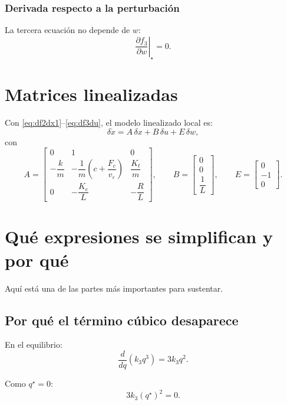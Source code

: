 \documentclass[11pt]{article}
\begin{document}
\subsubsection{Derivada respecto a la perturbaci\'on}

La tercera ecuaci\'on no depende de $w$:
\[
\left.\frac{\partial f_3}{\partial w}\right|_\star = 0.
\]

\section{Matrices linealizadas}

Con \eqref{eq:df2dx1}--\eqref{eq:df3du}, el modelo linealizado local es:
\begin{equation}
\delta \dot x = A\,\delta x + B\,\delta u + E\,\delta w,
\end{equation}
con
\begin{equation}
A=
\begin{bmatrix}
0 & 1 & 0\\[4pt]
-\dfrac{k}{m} & -\dfrac{1}{m}\left(c+\dfrac{F_c}{v_\varepsilon}\right) & \dfrac{K_t}{m}\\[8pt]
0 & -\dfrac{K_e}{L} & -\dfrac{R}{L}
\end{bmatrix},
\qquad
B=
\begin{bmatrix}
0\\
0\\
\dfrac{1}{L}
\end{bmatrix},
\qquad
E=
\begin{bmatrix}
0\\
-1\\
0
\end{bmatrix}.
\label{eq:lin_full}
\end{equation}

\section{Qu\'e expresiones se simplifican y por qu\'e}

Aqu\'i est\'a una de las partes m\'as importantes para sustentar.

\subsection{Por qu\'e el t\'ermino c\'ubico desaparece}

En el equilibrio:
\[
\frac{d}{dq}(k_3 q^3)=3k_3q^2.
\]

Como $q^\star=0$:
\[
3k_3(q^\star)^2 = 0.
\]
\end{document}
